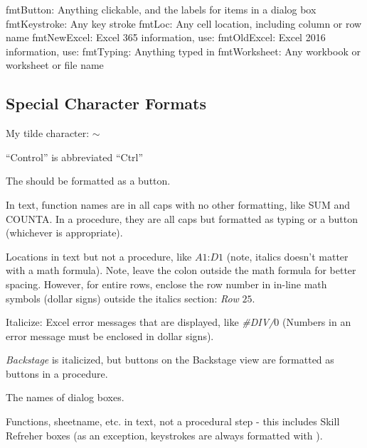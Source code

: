 \begin{enumerate}[resume]
fmtButton: Anything clickable, and the labels for items in a dialog box
fmtKeystroke: Any key stroke
fmtLoc: Any cell location, including column or row name 
fmtNewExcel: Excel 365 information, use: 
fmtOldExcel: Excel 2016 information, use: 
fmtTyping: Anything typed in
fmtWorksheet: Any workbook or worksheet or file name



\subsection{Special Character Formats}
My tilde character: $\sim$

``Control'' is abbreviated ``Ctrl''

The  should be formatted as a button.

In text, function names are in all caps with no other formatting, like SUM and COUNTA. In a procedure, they are all caps but formatted as typing or a button (whichever is appropriate).

Locations in text but not a procedure, like $ A1 $:$ D1 $ (note, italics doesn't matter with a math formula). Note, leave the colon outside the math formula for better spacing. However, for entire rows, enclose the row number in in-line math symbols (dollar signs) outside the italics section: \textit{Row} $ 25 $. 

Italicize:
  Excel error messages that are displayed, like \textit{\#DIV/$ 0 $} (Numbers in an error message must be enclosed in dollar signs).
    
  \textit{Backstage} is italicized, but buttons on the Backstage view are formatted as buttons in a procedure.
  
  The names of dialog boxes.
  
  Functions, sheetname, etc. in text, not a procedural step - this includes Skill Refreher boxes (as an exception, keystrokes are always formatted with \fmtKeystroke). 
  

\end{enumerate}
